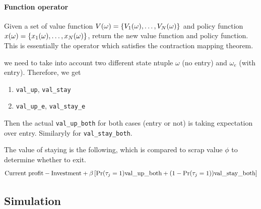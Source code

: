 \documentclass[12pt]{article}[margin=1in]
\begin{document}
\paragraph{Function operator} Given a set of value function $V(\omega)=\left\{V_1(\omega),\ldots,V_N(\omega)\right\}$ and policy function $x(\omega)=\left\{x_1(\omega),\ldots,x_N(\omega)\right\}$, return the new value function and policy function. This is essentially the operator which satisfies the contraction mapping theorem.

\begin{remark}
    we need to take into account two different state ntuple $\omega$ (no entry) and $\omega_e$ (with entry). Therefore, we get
    \begin{enumerate}
        \item \verb|val_up|, \verb|val_stay|
        \item \verb|val_up_e|, \verb|val_stay_e|
    \end{enumerate}
    Then the actual \verb|val_up_both| for both cases (entry or not) is taking expectation over entry. Similaryly for \verb|val_stay_both|.
\end{remark}

\begin{remark}
    The value of staying is the following, which is compared to scrap value $\phi$ to determine whether to exit.
    $$ \text{Current profit}-\text{Investment}+\beta\left[\Pr(\tau_j=1)\text{val\_up\_both} + (1-\Pr(\tau_j=1))\text{val\_stay\_both}\right] $$
\end{remark}





\subsection{Simulation}
\end{document}
